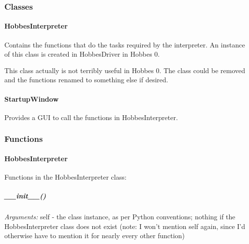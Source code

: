 \documentclass[12pt,letterpaper]{article}
\begin{document}
%
%
\subsubsection{Classes}
\label{4.1.0}

\setcounter{paragraph}{-1}



%
%
\paragraph{HobbesInterpreter}
\label{4.1.0.0}

Contains the functions that do the tasks required by the interpreter. An instance of this class is created in HobbesDriver in Hobbes 0.

This class actually is not terribly useful in Hobbes 0. The class could be removed and the functions renamed to something else if desired.



%
%
\paragraph{StartupWindow}
\label{4.1.0.1}

Provides a GUI to call the functions in HobbesInterpreter.



%
%
\subsubsection{Functions}
\label{4.1.1}

\setcounter{paragraph}{-1}



%
%
\paragraph{HobbesInterpreter}
\label{4.1.1.0}

Functions in the HobbesInterpreter class:

\setcounter{subparagraph}{-1}



%
%
\subparagraph{\_\_init\_\_()}
\label{4.1.1.0.0}

\emph{Arguments:} self - the class instance, as per Python conventions; nothing if the HobbesInterpreter class does not exist (note: I won't mention self again, since I'd otherwise have to mention it for nearly every other function)
\end{document}
